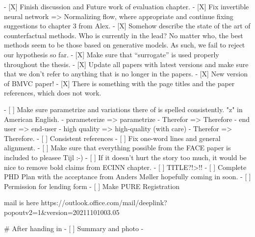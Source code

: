   - [X] Finish discussion and Future work of evaluation chapter.
  - [X] Fix invertible neural network => Normalizing flow, where appropriate and continue fixing suggestions to chapter 3 from Alex.
  - [X] Somehow describe the state of the art of counterfactual methods. Who is currently in the lead? No matter who, the best methods seem to be those based on generative models. As such, we fail to reject our hypothesis so far. 
  - [X] Make sure that ``surrogate'' is used properly throughout the thesis. 
  - [X] Update all papers with latest versions and make sure that we don't refer to anything that is no longer in the papers. 
  - [X] New version of BMVC paper!
  - [X] There is something with the page titles and the paper references, which does not work.
  
  - [ ] Make sure parametrize and variations there of is spelled consistently. "z" in American English.
        - parameterize => parametrize
        - Therefor => Therefore
        - end user => end-user
        - high quality => high-quality (with care)
        - Therefor => Therefore.
  - [ ] Consistent references
  - [ ] Fix one-word lines and general alignment.
  - [ ] Make sure that everything possible from the FACE paper is included to pleasee Tijl :-)
  - [ ] If it doesn't hurt the story too much, it would be nice to remove bold claims from ECINN chapter.
  - [ ] TITLE?!>!!
  - [ ] Complete PHD Plan with the acceptance from Anders Møller hopefully coming in soon. 
  - [ ] Permission for lending form
  - [ ] Make PURE Registration  
  
  mail is here https://outlook.office.com/mail/deeplink?popoutv2=1&version=20211101003.05
  
  # After handing in
  - [ ] Summary and photo
  - 